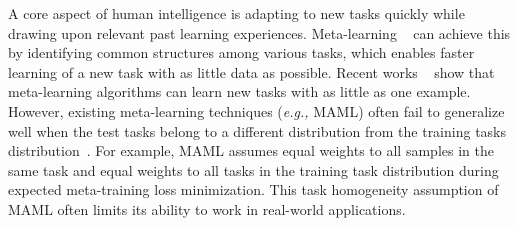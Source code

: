 A core aspect of human intelligence is adapting to new tasks quickly while drawing upon relevant past learning experiences. Meta-learning  ~\citep{schmidhuber1987, thrun2012learning, Naik1992MetaneuralNT} can achieve this by identifying common structures among various tasks, which enables faster learning of a new task with as little data as possible. Recent works ~\citep{santoro2016meta, vinyals2016matching, finn2017model} show that meta-learning algorithms can learn new tasks with as little as one example. 
However, existing meta-learning techniques (\emph{e.g.,} MAML) often fail to generalize well when the test tasks belong to a different distribution from the training tasks distribution~\citep{Chen2019ICLR}. For example, MAML assumes equal weights to all samples in the same task and equal weights to all tasks in the training task distribution during expected meta-training loss minimization. This task homogeneity assumption of MAML often limits its ability to work in real-world applications. 


